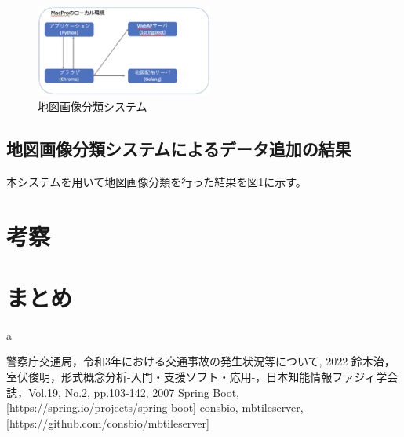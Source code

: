 \documentclass[a4j,8.5pt, twocolumn,fleqn]{jbook}
\begin{document}
\begin{figure}[htb]
\centering
\includegraphics[height=30mm]{images/mapclassification_server.eps}
\caption{地図画像分類システム}
\label{classifications}
\end{figure}

\subsection{地図画像分類システムによるデータ追加の結果}
本システムを用いて地図画像分類を行った結果を図1に示す。

\section{考察}

\section{まとめ}
a

\begin{thebibliography}{9}
警察庁交通局，令和3年における交通事故の発生状況等について, 2022
鈴木治，室伏俊明，形式概念分析-入門・支援ソフト・応用-，日本知能情報ファジィ学会誌，Vol.19, No.2, pp.103-142, 2007
Spring Boot, [https://spring.io/projects/spring-boot]
consbio, mbtileserver, [https://github.com/consbio/mbtileserver]




     
\end{thebibliography}
\end{document}
